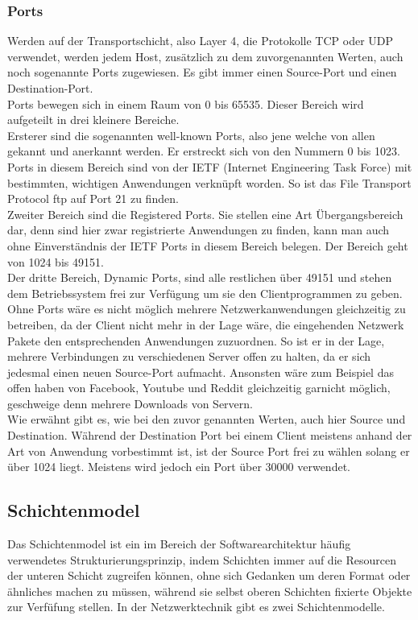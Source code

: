 \documentclass[11pt,a4paper]{report}
\begin{document}
\subsubsection{Ports}
Werden auf der Transportschicht, also Layer 4, die Protokolle TCP oder UDP verwendet, werden jedem Host, zusätzlich zu dem zuvorgenannten Werten, auch noch sogenannte Ports zugewiesen. Es gibt immer einen Source-Port und einen Destination-Port.\\
Ports bewegen sich in einem Raum von 0 bis 65535. Dieser Bereich wird aufgeteilt in drei kleinere Bereiche.\\
Ersterer sind die sogenannten well-known Ports, also jene welche von allen gekannt und anerkannt werden. Er erstreckt sich von den Nummern 0 bis 1023. Ports in diesem Bereich sind von der IETF (Internet Engineering Task Force) mit bestimmten, wichtigen Anwendungen verknüpft worden. So ist das File Transport Protocol ftp auf Port 21 zu finden.\\
Zweiter Bereich sind die Registered Ports. Sie stellen eine Art Übergangsbereich dar, denn sind hier zwar registrierte Anwendungen zu finden, kann man auch ohne Einverständnis der IETF Ports in diesem Bereich belegen. Der Bereich geht von 1024 bis 49151.\\
Der dritte Bereich, Dynamic Ports, sind alle restlichen über 49151 und stehen dem Betriebssystem frei zur Verfügung um sie den Clientprogrammen zu geben.\\

Ohne Ports wäre es nicht möglich mehrere Netzwerkanwendungen gleichzeitig zu betreiben, da der Client nicht mehr in der Lage wäre, die eingehenden Netzwerk Pakete den entsprechenden Anwendungen zuzuordnen. So ist er in der Lage, mehrere Verbindungen zu verschiedenen Server offen zu halten, da er sich jedesmal einen neuen Source-Port aufmacht. Ansonsten wäre zum Beispiel das offen haben von Facebook, Youtube und Reddit gleichzeitig garnicht möglich, geschweige denn mehrere Downloads von Servern.\\

Wie erwähnt gibt es, wie bei den zuvor genannten Werten, auch hier Source und Destination. Während der Destination Port bei einem Client meistens anhand der Art von Anwendung vorbestimmt ist, ist der Source Port frei zu wählen solang er über 1024 liegt. Meistens wird jedoch ein Port über 30000 verwendet. 
\subsection{Schichtenmodel}
Das Schichtenmodel ist ein im Bereich der Softwarearchitektur häufig verwendetes Strukturierungsprinzip, indem Schichten immer auf die Resourcen der unteren Schicht zugreifen können, ohne sich Gedanken um deren Format oder ähnliches machen zu müssen, während sie selbst oberen Schichten fixierte Objekte zur Verfüfung stellen. In der Netzwerktechnik gibt es zwei Schichtenmodelle.
\end{document}
